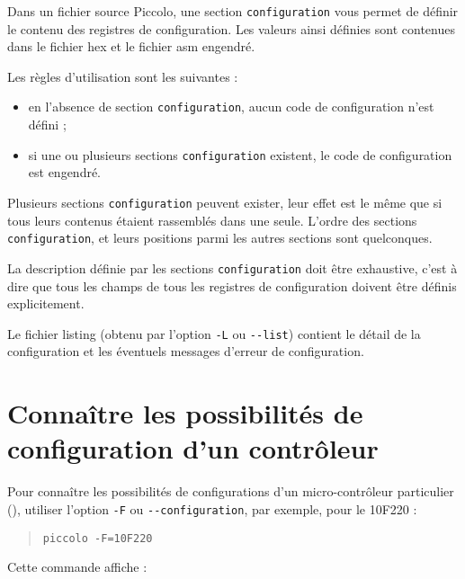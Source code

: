 
\cleardoublepage


\thispagestyle{empty}

Dans un fichier source Piccolo, une section \texttt{configuration} vous permet de définir le contenu des registres de configuration. Les valeurs ainsi définies sont contenues dans le fichier hex et le fichier asm engendré.


Les règles d'utilisation sont les suivantes :
\begin{itemize}
  \item en l’absence de section \texttt{configuration}, aucun code de configuration n’est défini ;
  \item si une ou plusieurs sections \texttt{configuration} existent, le code de configuration est engendré.
\end{itemize}

Plusieurs sections \texttt{configuration} peuvent exister, leur effet est le même que si tous leurs contenus étaient rassemblés dans une seule. L’ordre des sections \texttt{configuration}, et leurs positions parmi les autres sections sont quelconques.

La description définie par les sections \texttt{configuration} doit être exhaustive, c’est à dire que tous les champs de tous les registres de configuration doivent être définis explicitement.

Le fichier listing (obtenu par l’option \texttt{-L} ou \texttt{-{}-list}) contient le détail de la configuration et les éventuels messages d’erreur de configuration.




\section{Connaître les possibilités de configuration d'un contrôleur}

Pour connaître les possibilités de configurations d’un micro-contrôleur particulier (), utiliser l’option \texttt{-F} ou \texttt{-{}-configuration}, par exemple, pour le 10F220 :
\begin{quote}
\texttt{piccolo -F=10F220}
\end{quote}

Cette commande affiche :


